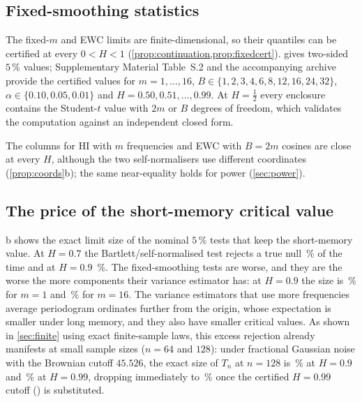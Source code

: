 \subsection{Fixed-smoothing statistics}
The fixed-$m$ and EWC limits are finite-dimensional, so their quantiles can be certified at every $0<H<1$
(\cref{prop:continuation,prop:fixedcert}).  gives two-sided $5\,\%$ values; Supplementary Material
Table~S.2 and the accompanying archive provide the  certified values for $m=1,\dots,16$,
$B\in\{1,2,3,4,6,8,12,16,24,32\}$, $\alpha\in\{0.10,0.05,0.01\}$ and $H=0.50,0.51,\dots,0.99$. At $H=\frac12$ every
enclosure contains the Student-$t$ value with $2m$ or $B$ degrees of freedom, which validates the computation against an
independent closed form.

\begin{table}[tbp]\centering\small
\caption{Certified two-sided 5\% cutoffs for fixed-periodogram and cosine tests.}\label{tab:fixedcv}
%
\end{table}

The columns for HI with $m$ frequencies and EWC with $B=2m$ cosines are close at every $H$, although the two
self-normalisers use different coordinates (\cref{prop:coords}b); the same near-equality holds for power
(\cref{sec:power}).

\subsection{The price of the short-memory critical value}
b shows the exact limit size of the nominal $5\,\%$ tests that keep the short-memory value. At $H=0.7$
the Bartlett/self-normalised test rejects a true null \,\% of the time and at $H=0.9$
\,\%. The fixed-smoothing tests are worse, and they are the worse the more components their
variance estimator has: at $H=0.9$ the size is \,\% for $m=1$ and \,\%
for $m=16$. The variance estimators that use more frequencies average periodogram ordinates further from the origin,
whose expectation is smaller under long memory, and they also have smaller critical values. As shown in \cref{sec:finite}
using exact finite-sample laws, this excess rejection already manifests at small sample sizes ($n=64$ and $128$): under
fractional Gaussian noise with the Brownian cutoff $45.526$, the exact size of $T_n$ at $n=128$ is
\,\% at $H=0.9$ and \,\% at $H=0.99$, dropping immediately to
\,\% once the certified $H=0.99$ cutoff () is substituted.


